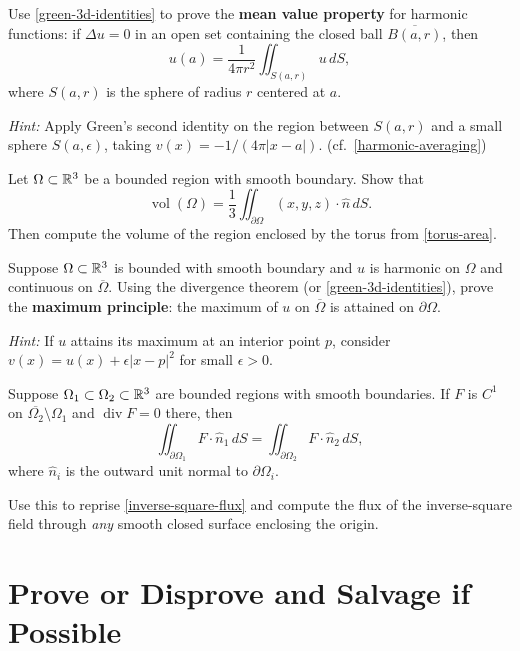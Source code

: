 \documentclass{homework}
\begin{document}
\begin{problem}
  Use \ref{green-3d-identities} to prove the \textbf{mean value property} for harmonic functions:
  if $\Delta u = 0$ in an open set containing the closed ball $\overline{B(a,r)}$, then
  \[
    u(a) = \frac{1}{4\pi r^2}\iint_{S(a,r)} u\,dS,
  \]
  where $S(a,r)$ is the sphere of radius $r$ centered at $a$.

  \textit{Hint:} Apply Green's second identity on the region between $S(a,r)$ and a small sphere $S(a,\epsilon)$, taking $v(x) = -1/(4\pi|x-a|)$.  \hfill (cf.~\ref{harmonic-averaging})
\end{problem}

\begin{problem}
  Let $\Omega \subset \mathbb{R}^3$ be a bounded region with smooth boundary.  Show that
  \[
    \operatorname{vol}(\Omega) = \frac{1}{3}\iint_{\partial\Omega} (x,y,z)\cdot\hat{n}\,dS.
  \]
  Then compute the volume of the region enclosed by the torus from \ref{torus-area}.
\end{problem}

\begin{problem}
  Suppose $\Omega\subset\mathbb{R}^3$ is bounded with smooth boundary and $u$ is harmonic on $\Omega$ and continuous on $\overline{\Omega}$.  Using the divergence theorem (or \ref{green-3d-identities}), prove the \textbf{maximum principle}: the maximum of $u$ on $\overline{\Omega}$ is attained on $\partial\Omega$.

  \textit{Hint:} If $u$ attains its maximum at an interior point $p$, consider $v(x) = u(x) + \epsilon |x-p|^2$ for small $\epsilon > 0$.
\end{problem}

\begin{problem}
  Suppose $\Omega_1 \subset \Omega_2 \subset \mathbb{R}^3$ are bounded regions with smooth boundaries. If $F$ is $C^1$ on $\overline{\Omega_2}\setminus\Omega_1$ and $\operatorname{div} F = 0$ there, then
  \[
    \iint_{\partial\Omega_1} F\cdot\hat{n}_1\,dS = \iint_{\partial\Omega_2} F\cdot\hat{n}_2\,dS,
  \]
  where $\hat{n}_i$ is the outward unit normal to $\partial\Omega_i$.

  Use this to reprise \ref{inverse-square-flux} and compute the flux of the inverse-square field through \emph{any} smooth closed surface enclosing the origin.
\end{problem}

\section{Prove or Disprove and Salvage if Possible}
\end{document}
